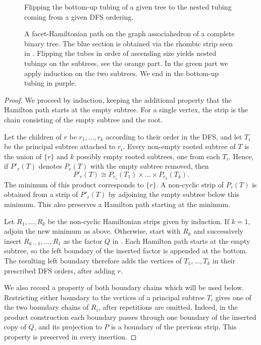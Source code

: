 \documentclass[fontsize=11pt,a4paper,DIV=12]{scrartcl}
\begin{document}
\begin{figure}[!ht]
	\centering
	
	\caption{Flipping the bottom-up tubing of a given tree to the nested tubing coming from a given DFS ordering.}
	\label{fig:tree flipping up}
\end{figure}

\begin{figure}[!ht]
	\centering
	
	\caption{A facet-Hamiltonian path on the graph associahedron of a complete binary tree. The blue section is obtained via the rhombic strip seen in . Flipping the tubes in order of ascending size yields nested tubings on the subtrees, see the orange part. In the green part we apply induction on the two subtrees. We end in the bottom-up tubing in purple.}
	\label{fig:fh for complete binary}
\end{figure}

\treeassociahedrars*
	\begin{proof}
		We proceed by induction, keeping the additional property that the Hamilton path starts at the empty subtree. For a single vertex, the strip is the chain consisting of the empty subtree and the root.

		Let the children of $r$ be $r_1,\ldots,r_k$ according to their order in the DFS, and let $T_i$ be the principal subtree attached to $r_i$. Every non-empty rooted subtree of $T$ is the union of $\{r\}$ and $k$ possibly empty rooted subtrees, one from each $T_i$. Hence, if $P'_r(T)$ denotes $P_r(T)$ with the empty subtree removed, then
		\[
			P'_r(T)\cong P_{r_1}(T_1)\times\ldots\times P_{r_k}(T_k).
		\]
		The minimum of this product corresponds to $\{r\}$. A non-cyclic strip of $P_r(T)$ is obtained from a strip of $P'_r(T)$ by adjoining the empty subtree below this minimum. This also preserves a Hamilton path starting at the minimum.

		Let $R_1,\ldots,R_k$ be the non-cyclic Hamiltonian strips given by induction. If $k=1$, adjoin the new minimum as above. Otherwise, start with $R_k$ and successively insert $R_{k-1},\ldots,R_1$ as the factor $Q$ in . Each Hamilton path starts at the empty subtree, so the left boundary of the inserted factor is appended at the bottom. The resulting left boundary therefore adds the vertices of $T_1,\ldots,T_k$ in their prescribed DFS orders, after adding $r$.

		We also record a property of both boundary chains which will be used below. Restricting either boundary to the vertices of a principal subtree $T_i$ gives one of the two boundary chains of $R_i$, after repetitions are omitted. Indeed, in the product construction each boundary passes through one boundary of the inserted copy of $Q$, and its projection to $P$ is a boundary of the previous strip. This property is preserved in every insertion.
	\end{proof}
\end{document}
